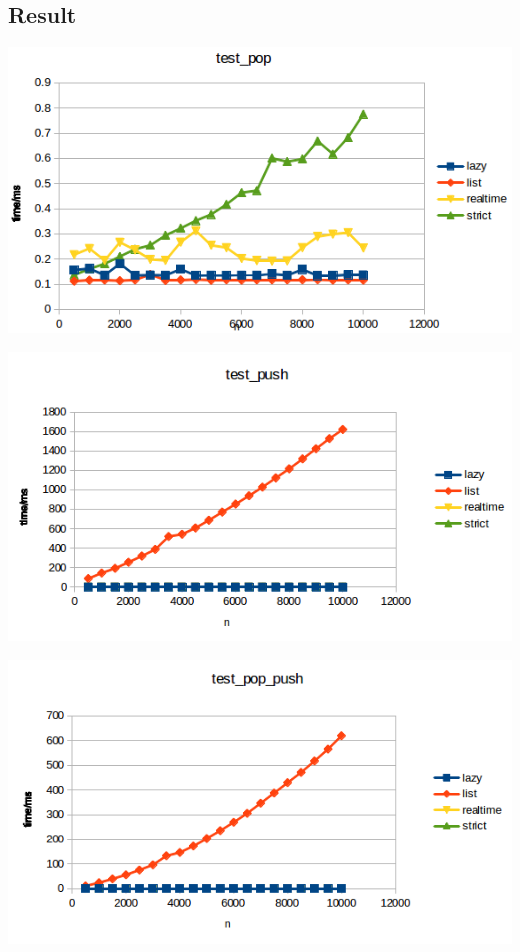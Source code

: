 \subsection{Result}
\includegraphics{Graphs/test_pop.png}


\includegraphics{Graphs/test_push.png}


\includegraphics{Graphs/test_pop_push.png}


